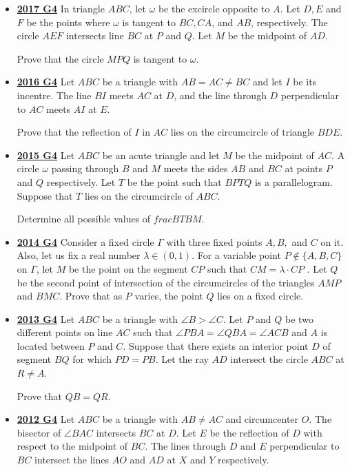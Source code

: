 \documentclass[11pt]{scrartcl}
\begin{document}
\begin{itemize}[leftmargin=*]
Prove that the lines $AA_2$, $BB_2$, and $CC_2$ are concurrent on $\Omega$.
\item \href{https://artofproblemsolving.com/community/c6h1671273p10632290}{\textbf{2017 G4}} 	In triangle $ABC$, let $\omega$ be the excircle opposite to $A$. Let $D, E$ and $F$ be the points where $\omega$ is tangent to $BC, CA$, and $AB$, respectively. The circle $AEF$ intersects line $BC$ at $P$ and $Q$. Let $M$ be the midpoint of $AD$. 

Prove that the circle $MPQ$ is tangent to $\omega$.
\item \href{https://artofproblemsolving.com/community/c6h1480714p8639304}{\textbf{2016 G4}} 	Let $ABC$ be a triangle with $AB = AC \neq BC$ and let $I$ be its incentre. The line $BI$ meets $AC$ at $D$, and the line through $D$ perpendicular to $AC$ meets $AI$ at $E$. 

Prove that the reflection of $I$ in $AC$ lies on the circumcircle of triangle $BDE$.
\item \href{https://artofproblemsolving.com/community/c6h1268843p6622159}{\textbf{2015 G4}} Let $ABC$ be an acute triangle and let $M$ be the midpoint of $AC$. A circle $\omega$ passing through $B$ and $M$ meets the sides $AB$ and $BC$ at points $P$ and $Q$ respectively. Let $T$ be the point such that $BPTQ$ is a parallelogram. Suppose that $T$ lies on the circumcircle of $ABC$. 

Determine all possible values of $\displaystyle frac{BT}{BM}$.
\item \href{https://artofproblemsolving.com/community/c6h1113192p5083561}{\textbf{2014 G4}} 	Consider a fixed circle $\Gamma$ with three fixed points $A, B,$ and $C$ on it. Also, let us fix a real number $\lambda \in(0,1)$. For a variable point $P \not\in\{A, B, C\}$ on $\Gamma$, let $M$ be the point on the segment $CP$ such that $CM =\lambda\cdot  CP$ . Let $Q$ be the second point of intersection of the circumcircles of the triangles $AMP$ and $BMC$. Prove that as $P$ varies, the point $Q$ lies on a fixed circle.
\item \href{https://artofproblemsolving.com/community/c6h597240p3544091}{\textbf{2013 G4}} Let $ABC$ be a triangle with $\angle B > \angle C$. Let $P$ and $Q$ be two different points on line $AC$ such that $\angle PBA = \angle QBA = \angle ACB $ and $A$ is located between $P$ and $C$. Suppose that there exists an interior point $D$ of segment $BQ$ for which $PD=PB$. Let the ray $AD$ intersect the circle $ABC$ at $R \neq A$. 

Prove that $QB = QR$.
\item \href{https://artofproblemsolving.com/community/c6h597240p3544091}{\textbf{2012 G4}} Let $ABC$ be a triangle with $AB \neq AC$ and circumcenter $O$. The bisector of $\angle BAC$ intersects $BC$ at $D$. Let $E$ be the reflection of $D$ with respect to the midpoint of $BC$. The lines through $D$ and $E$ perpendicular to $BC$ intersect the lines $AO$ and $AD$ at $X$ and $Y$ respectively. 


\end{itemize}
\end{document}

